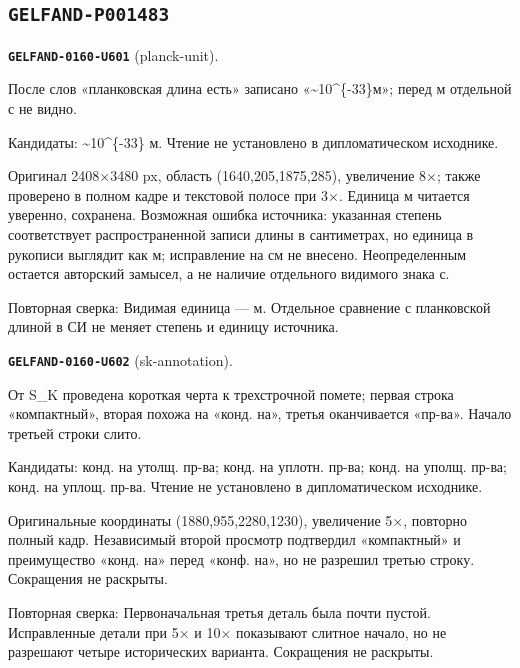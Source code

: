 \subsection*{\texttt{GELFAND-P001483}}
\par\noindent\leavevmode{}\label{GELFAND-0160-U601}\label{GELFAND-P001483:planck-unit}\textbf{\texttt{GELFAND-0160-U601}} (planck-unit).\nopagebreak[4]\par
После слов «планковская длина есть» записано «\textasciitilde{}10\textasciicircum{}\{-33\}м»; перед м отдельной с не видно.\par
Кандидаты: \textasciitilde{}10\textasciicircum{}\{-33\} м. Чтение не установлено в дипломатическом исходнике.\par
Оригинал 2408×3480 px, область (1640,205,1875,285), увеличение 8×; также проверено в полном кадре и текстовой полосе при 3×. Единица м читается уверенно, сохранена. Возможная ошибка источника: указанная степень соответствует распространенной записи длины в сантиметрах, но единица в рукописи выглядит как м; исправление на см не внесено. Неопределенным остается авторский замысел, а не наличие отдельного видимого знака с.\par
Повторная сверка: Видимая единица — м. Отдельное сравнение с планковской длиной в СИ не меняет степень и единицу источника.\par\medskip
\par\noindent\leavevmode{}\label{GELFAND-0160-U602}\label{GELFAND-P001483:sk-annotation}\textbf{\texttt{GELFAND-0160-U602}} (sk-annotation).\nopagebreak[4]\par
От S\_K проведена короткая черта к трехстрочной помете; первая строка «компактный», вторая похожа на «конд. на», третья оканчивается «пр-ва». Начало третьей строки слито.\par
Кандидаты: конд. на утолщ. пр-ва; конд. на уплотн. пр-ва; конд. на уполщ. пр-ва; конд. на уплощ. пр-ва. Чтение не установлено в дипломатическом исходнике.\par
Оригинальные координаты (1880,955,2280,1230), увеличение 5×, повторно полный кадр. Независимый второй просмотр подтвердил «компактный» и преимущество «конд. на» перед «конф. на», но не разрешил третью строку. Сокращения не раскрыты.\par
Повторная сверка: Первоначальная третья деталь была почти пустой. Исправленные детали при 5× и 10× показывают слитное начало, но не разрешают четыре исторических варианта. Сокращения не раскрыты.\par\medskip
